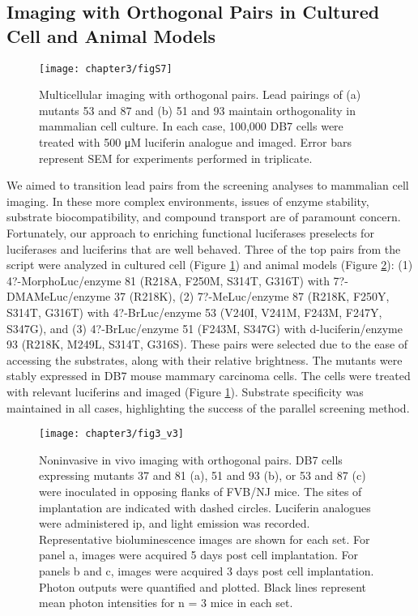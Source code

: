 \subsection*{Imaging with Orthogonal Pairs in Cultured Cell and Animal Models}
\begin{figure}[htb]
\texttt{[image: chapter3/figS7]}
\centering
\caption[Multicellular imaging with orthogonal pairs]{Multicellular imaging with orthogonal pairs. Lead pairings of (a) mutants 53 and 87 and (b) 51 and 93 maintain orthogonality in mammalian cell culture. In each case, 100,000 DB7 cells were treated with 500 μM luciferin analogue and imaged. Error bars represent SEM for experiments performed in triplicate.}
  \label{fig:S7}
\end{figure}
We aimed to transition lead pairs from the screening analyses to mammalian cell imaging. In these more complex environments, issues of enzyme stability, substrate biocompatibility, and compound transport are of paramount concern. Fortunately, our approach to enriching functional luciferases preselects for luciferases and luciferins that are well behaved. Three of the top pairs from the script were analyzed in cultured cell (Figure \ref{fig:S7})
and animal models (Figure \ref{fig:inVivo}): (1) 4?-MorphoLuc/enzyme 81 (R218A, F250M, S314T, G316T) with 7?-DMAMeLuc/enzyme 37 (R218K), (2) 7?-MeLuc/enzyme 87 (R218K, F250Y, S314T, G316T) with 4?-BrLuc/enzyme 53 (V240I, V241M, F243M, F247Y, S347G), and (3) 4?-BrLuc/enzyme 51 (F243M, S347G) with d-luciferin/enzyme 93 (R218K, M249L, S314T, G316S). These pairs were selected due to the ease of accessing the substrates, along with their relative brightness. The mutants were stably expressed in DB7 mouse mammary carcinoma cells. The cells were treated with relevant luciferins and imaged (Figure \ref{fig:S7}). Substrate specificity was maintained in all cases, highlighting the success of the parallel screening method.
\par
\begin{figure}[htb]
\texttt{[image: chapter3/fig3\_v3]}
\centering
\caption[Noninvasive in vivo imaging with orthogonal pairs]{Noninvasive in vivo imaging with orthogonal pairs. DB7 cells expressing mutants 37 and 81 (a), 51 and 93 (b), or 53 and 87 (c) were inoculated in opposing flanks of FVB/NJ mice. The sites of implantation are indicated with dashed circles. Luciferin analogues were administered ip, and light emission was recorded. Representative bioluminescence images are shown for each set. For panel a, images were acquired 5 days post cell implantation. For panels b and c, images were acquired 3 days post cell implantation. Photon outputs were quantified and plotted. Black lines represent mean photon intensities for n = 3 mice in each set.}
  \label{fig:inVivo}
\end{figure}
